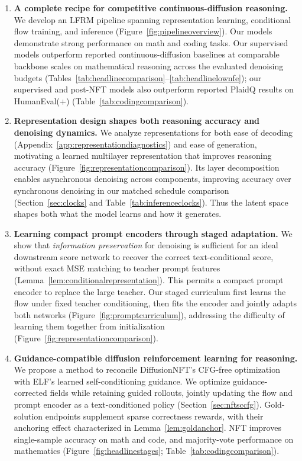 \documentclass{article}
\begin{document}
\begin{enumerate}
    \item \textbf{A complete recipe for competitive continuous-diffusion reasoning.}
    We develop an LFRM pipeline spanning representation learning, conditional flow training, and inference (Figure~\ref{fig:pipelineoverview}). Our models demonstrate strong performance on math and coding tasks. Our supervised models outperform reported continuous-diffusion baselines at comparable backbone scales on mathematical reasoning across the evaluated denoising budgets (Tables~\ref{tab:headlinecomparison}--\ref{tab:headlinelownfe}); our supervised and post-NFT models also outperform reported PlaidQ results on HumanEval(+) (Table~\ref{tab:codingcomparison}).

    \item \textbf{Representation design shapes both reasoning accuracy and denoising dynamics.}
    We analyze representations for both ease of decoding (Appendix~\ref{app:representationdiagnostics}) and ease of generation, motivating a learned multilayer representation that improves reasoning accuracy (Figure~\ref{fig:representationcomparison}). Its layer decomposition enables asynchronous denoising across components, improving accuracy over synchronous denoising in our matched schedule comparison (Section~\ref{sec:clocks} and Table~\ref{tab:inferenceclocks}). Thus the latent space shapes both what the model learns and how it generates.

    \item \textbf{Learning compact prompt encoders through staged adaptation.}
    We show that \emph{information preservation} for denoising is sufficient for an ideal downstream score network to recover the correct text-conditional score, without exact MSE matching to teacher prompt features (Lemma~\ref{lem:conditionalrepresentation}). This permits a compact prompt encoder to replace the large teacher. Our staged curriculum first learns the flow under fixed teacher conditioning, then fits the encoder and jointly adapts both networks (Figure~\ref{fig:promptcurriculum}), addressing the difficulty of learning them together from initialization (Figure~\ref{fig:representationcomparison}).

    \item \textbf{Guidance-compatible diffusion reinforcement learning for reasoning.}
    We propose a method to reconcile DiffusionNFT's CFG-free optimization \citep{diffusionnft} with ELF's learned self-conditioning guidance. We optimize guidance-corrected fields while retaining guided rollouts, jointly updating the flow and prompt encoder as a text-conditioned policy (Section~\ref{sec:nftsccfg}). Gold-solution endpoints supplement sparse correctness rewards, with their anchoring effect characterized in Lemma~\ref{lem:goldanchor}. NFT improves single-sample accuracy on math and code, and majority-vote performance on mathematics (Figure~\ref{fig:headlinestages}; Table~\ref{tab:codingcomparison}).
\end{enumerate}
\end{document}
